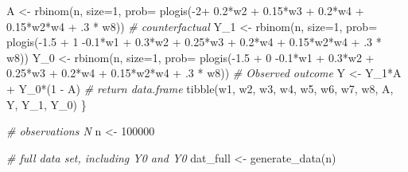 \documentclass[
]{article}
\newenvironment{Shaded}{\begin{snugshade}}{\end{snugshade}}
\newcommand{\AttributeTok}[1]{\textcolor[rgb]{0.77,0.63,0.00}{#1}}
\newcommand{\CommentTok}[1]{\textcolor[rgb]{0.56,0.35,0.01}{\textit{#1}}}
\newcommand{\DecValTok}[1]{\textcolor[rgb]{0.00,0.00,0.81}{#1}}
\newcommand{\FloatTok}[1]{\textcolor[rgb]{0.00,0.00,0.81}{#1}}
\newcommand{\FunctionTok}[1]{\textcolor[rgb]{0.00,0.00,0.00}{#1}}
\newcommand{\NormalTok}[1]{#1}
\newcommand{\OtherTok}[1]{\textcolor[rgb]{0.56,0.35,0.01}{#1}}
\newcommand{\SpecialCharTok}[1]{\textcolor[rgb]{0.00,0.00,0.00}{#1}}
\begin{document}
\begin{Shaded}
\begin{Highlighting}[]
\NormalTok{  A  }\OtherTok{\textless{}{-}} \FunctionTok{rbinom}\NormalTok{(n, }\AttributeTok{size=}\DecValTok{1}\NormalTok{, }\AttributeTok{prob=} \FunctionTok{plogis}\NormalTok{(}\SpecialCharTok{{-}}\DecValTok{2}\SpecialCharTok{+} \FloatTok{0.2}\SpecialCharTok{*}\NormalTok{w2 }\SpecialCharTok{+} \FloatTok{0.15}\SpecialCharTok{*}\NormalTok{w3 }\SpecialCharTok{+} \FloatTok{0.2}\SpecialCharTok{*}\NormalTok{w4 }\SpecialCharTok{+} \FloatTok{0.15}\SpecialCharTok{*}\NormalTok{w2}\SpecialCharTok{*}\NormalTok{w4 }\SpecialCharTok{+}\NormalTok{ .}\DecValTok{3} \SpecialCharTok{*}\NormalTok{ w8))}
  \CommentTok{\# counterfactual}
\NormalTok{  Y\_1 }\OtherTok{\textless{}{-}} \FunctionTok{rbinom}\NormalTok{(n, }\AttributeTok{size=}\DecValTok{1}\NormalTok{, }\AttributeTok{prob=} \FunctionTok{plogis}\NormalTok{(}\SpecialCharTok{{-}}\FloatTok{1.5} \SpecialCharTok{+} \DecValTok{1} \SpecialCharTok{{-}}\FloatTok{0.1}\SpecialCharTok{*}\NormalTok{w1 }\SpecialCharTok{+} \FloatTok{0.3}\SpecialCharTok{*}\NormalTok{w2 }\SpecialCharTok{+} \FloatTok{0.25}\SpecialCharTok{*}\NormalTok{w3 }\SpecialCharTok{+} \FloatTok{0.2}\SpecialCharTok{*}\NormalTok{w4 }\SpecialCharTok{+} \FloatTok{0.15}\SpecialCharTok{*}\NormalTok{w2}\SpecialCharTok{*}\NormalTok{w4 }\SpecialCharTok{+}\NormalTok{ .}\DecValTok{3} \SpecialCharTok{*}\NormalTok{ w8))}
\NormalTok{  Y\_0 }\OtherTok{\textless{}{-}} \FunctionTok{rbinom}\NormalTok{(n, }\AttributeTok{size=}\DecValTok{1}\NormalTok{, }\AttributeTok{prob=} \FunctionTok{plogis}\NormalTok{(}\SpecialCharTok{{-}}\FloatTok{1.5} \SpecialCharTok{+} \DecValTok{0} \SpecialCharTok{{-}}\FloatTok{0.1}\SpecialCharTok{*}\NormalTok{w1 }\SpecialCharTok{+} \FloatTok{0.3}\SpecialCharTok{*}\NormalTok{w2 }\SpecialCharTok{+} \FloatTok{0.25}\SpecialCharTok{*}\NormalTok{w3 }\SpecialCharTok{+} \FloatTok{0.2}\SpecialCharTok{*}\NormalTok{w4 }\SpecialCharTok{+} \FloatTok{0.15}\SpecialCharTok{*}\NormalTok{w2}\SpecialCharTok{*}\NormalTok{w4 }\SpecialCharTok{+}\NormalTok{ .}\DecValTok{3} \SpecialCharTok{*}\NormalTok{ w8))}
  \CommentTok{\# Observed outcome}
\NormalTok{  Y }\OtherTok{\textless{}{-}}\NormalTok{ Y\_1}\SpecialCharTok{*}\NormalTok{A }\SpecialCharTok{+}\NormalTok{ Y\_0}\SpecialCharTok{*}\NormalTok{(}\DecValTok{1} \SpecialCharTok{{-}}\NormalTok{ A)}
  \CommentTok{\# return data.frame}
  \FunctionTok{tibble}\NormalTok{(w1, w2, w3, w4, w5, w6, w7, w8, A, Y, Y\_1, Y\_0)}
\NormalTok{\}}

\CommentTok{\# observations N}
\NormalTok{n }\OtherTok{\textless{}{-}} \DecValTok{100000}

\CommentTok{\# full data set, including Y0 and Y0}
\NormalTok{dat\_full }\OtherTok{\textless{}{-}} \FunctionTok{generate\_data}\NormalTok{(n)}


\end{Highlighting}
\end{Shaded}
\end{document}
